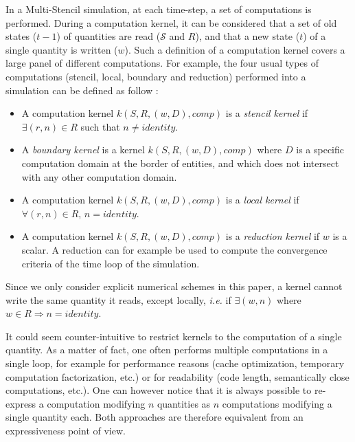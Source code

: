 In a Multi-Stencil simulation, at each time-step, a set of computations is performed. During a computation kernel, it can be considered that a set of old states ($t-1$) of quantities are read ($\mathcal{S}$ and $R$), and that a new state ($t$) of a single quantity is written ($w$).
Such a definition of a computation kernel covers a large panel of different computations. For example, the four usual types of computations (stencil, local, boundary and reduction) performed into a simulation can be defined as follow :
\begin{itemize}
\item A computation kernel $k(S,R,(w,D),comp)$ is a \emph{stencil kernel} if $\exists (r,n) \in R$ such that $n \neq identity$. %
\item A \emph{boundary kernel} is a kernel $k(S,R,(w,D),comp)$ where $D$ is a specific computation domain at the border of entities, and which does not intersect with any other computation domain.
\item A computation kernel $k(S,R,(w,D),comp)$ is a \emph{local kernel} if $\forall (r,n) \in R$, $n = identity$.
\item A computation kernel $k(S,R,(w,D),comp)$ is a \emph{reduction kernel} if $w$ is a scalar. A reduction can for example be used to compute the convergence criteria of the time loop of the simulation.
\end{itemize}

Since we only consider explicit numerical schemes in this paper, a kernel cannot write the same quantity it reads, except locally, \textit{i.e.} if $\exists (w,n)$ where $w \in R\Rightarrow n=identity$.

It could seem counter-intuitive to restrict kernels to the computation of a single quantity.
As a matter of fact, one often performs multiple computations in a single loop, for example for performance reasons (cache optimization, temporary computation factorization, etc.) or for readability (code length, semantically close computations, etc.).
One can however notice that it is always possible to re-express a computation modifying $n$ quantities as $n$ computations modifying a single quantity each.
Both approaches are therefore equivalent from an expressiveness point of view.


